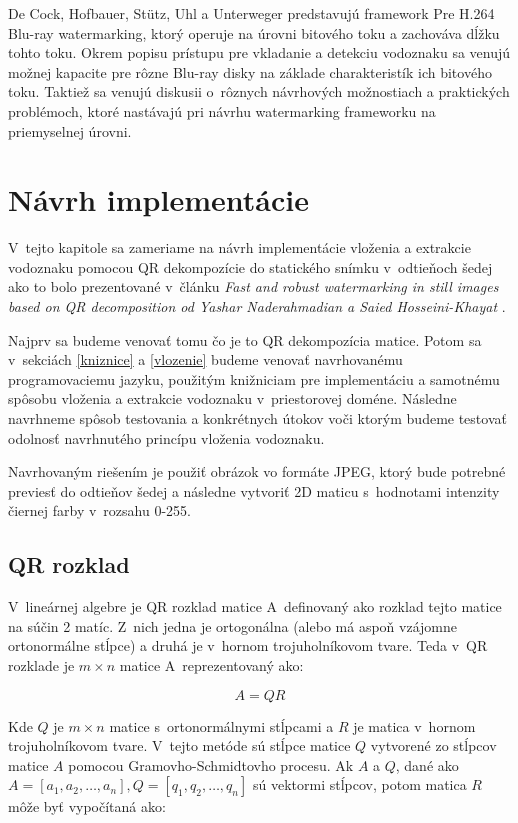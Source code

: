 De Cock, Hofbauer, Stütz, Uhl a Unterweger \cite{DeCock2015} predstavujú framework Pre H.264 Blu-ray watermarking, ktorý operuje na úrovni bitového toku a zachováva dĺžku tohto toku. Okrem popisu prístupu pre vkladanie a detekciu vodoznaku sa venujú možnej kapacite pre rôzne Blu-ray disky na základe charakteristík ich bitového toku. Taktiež sa venujú diskusii o~rôznych návrhových možnostiach a praktických problémoch, ktoré nastávajú pri návrhu watermarking frameworku na priemyselnej úrovni.

\chapter{Návrh implementácie}
\label{ch-design}
V~tejto kapitole sa zameriame na návrh implementácie vloženia a extrakcie vodoznaku pomocou QR dekompozície do statického snímku v~odtieňoch šedej ako to bolo prezentované v~článku {\it Fast and robust watermarking in still images based on QR decomposition od Yashar Naderahmadian a Saied Hosseini-Khayat} \cite{QRdecomposition}.

Najprv sa budeme venovať tomu čo je to QR dekompozícia matice. Potom sa v~sekciách \ref{kniznice} a \ref{vlozenie} budeme venovať navrhovanému programovaciemu jazyku, použitým knižniciam pre implementáciu a samotnému spôsobu vloženia a extrakcie vodoznaku v~priestorovej doméne. Následne navrhneme spôsob testovania a konkrétnych útokov voči ktorým budeme testovať odolnosť navrhnutého princípu vloženia vodoznaku.

Navrhovaným riešením je použiť obrázok vo formáte JPEG, ktorý bude potrebné previesť do odtieňov šedej a následne vytvoriť 2D maticu s~hodnotami intenzity čiernej farby v~rozsahu 0-255.

\section{QR rozklad}
V~lineárnej algebre je QR rozklad matice A~definovaný ako rozklad tejto matice na súčin 2 matíc. Z~nich jedna je ortogonálna (alebo má aspoň vzájomne ortonormálne stĺpce) a druhá je v~hornom trojuholníkovom tvare. Teda v~QR rozklade je $m \times n$ matice A~reprezentovaný ako:

\begin{equation}
A = QR
\end{equation}

Kde $Q$ je $m \times n$ matice s~ortonormálnymi stĺpcami a $R$ je matica v~hornom trojuholníkovom tvare. V~tejto metóde sú stĺpce matice $Q$ vytvorené zo stĺpcov matice $A$ pomocou Gramovho-Schmidtovho procesu. Ak $A$ a $Q$, dané ako $A=[a_1, a_2, \dots, a_n ], Q=[q_1, q_2, \dots, q_n ] $ sú vektormi stĺpcov, potom matica $R$ môže byť vypočítaná ako:

